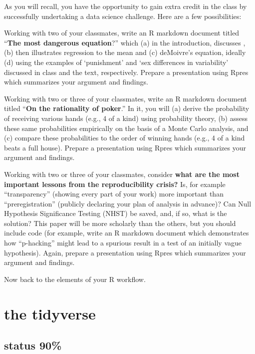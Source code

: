 \documentclass[
  openany]{book}
\begin{document}
As you will recall, you have the opportunity to gain extra credit in the class by successfully undertaking a data science challenge. Here are a few possibilities:

Working with two of your classmates, write an R markdown document titled ``\textbf{The most dangerous equation}?'' which (a) in the introduction, discusses \citet{wainer2007most}, (b) then illustrates regression to the mean and (c) deMoivre's equation, ideally (d) using the examples of `punishment' and `sex differences in variability' discussed in class and the text, respectively. Prepare a presentation using Rpres which summarizes your argument and findings.

Working with two or three of your classmates, write an R markdown document titled ``\textbf{On the rationality of poker}.'' In it, you will (a) derive the probability of receiving various hands (e.g., 4 of a kind) using probability theory, (b) assess these same probabilities empirically on the basis of a Monte Carlo analysis, and (c) compare these probabilities to the order of winning hands (e.g., 4 of a kind beats a full house). Prepare a presentation using Rpres which summarizes your argument and findings.

Working with two or three of your classmates, consider \textbf{what are the most important lessons from the reproducibility crisis?} Is, for example ``transparency'' (showing every part of your work) more important than ``preregistration'' (publicly declaring your plan of analysis in advance)? Can Null Hypothesis Significance Testing (NHST) be saved, and, if so, what is the solution? This paper will be more scholarly than the others, but you should include code (for example, write an R markdown document which demonstrates how ``p-hacking'' might lead to a spurious result in a test of an initially vague hypothesis). Again, prepare a presentation using Rpres which summarizes your argument and findings.

Now back to the elements of your R workflow.

\hypertarget{the-tidyverse}{%
\chapter{the tidyverse}\label{the-tidyverse}}

\hypertarget{status-90-4}{%
\section*{status 90\%}\label{status-90-4}}
\end{document}
